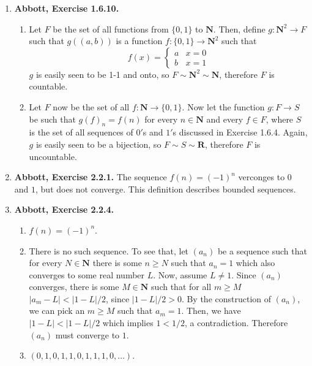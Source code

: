\documentclass{article}
\newcommand{\N}{\mathbf{N}}
\newcommand{\R}{\mathbf{R}}
\newcommand{\exc}[2][Abbott]{\item \textbf{#1, Exercise #2.}}
\begin{document}
\begin{enumerate}
	\exc{1.6.10}
				      	          
	\begin{enumerate}
		\item Let $F$ be the set of all functions from $\{0, 1\}$ to $\N$. Then, define $g : \N^2 \rightarrow F$ such that $g((a, b))$ is a function $f : \{0, 1\} \rightarrow \N^2$ such that \begin{equation*}
		      f(x) = \begin{cases}
		      a & x = 0 \\
		      b & x = 1
		\end{cases}
		\end{equation*}
		$g$ is easily seen to be 1-1 and onto, so $F \sim \N^2 \sim \N$, therefore $F$ is countable.
							      		      	        
		\item Let $F$ now be the set of all $f : \N \rightarrow \{0, 1\}$. Now let the function $g : F \rightarrow S$ be such that $g(f)_n = f(n)$ for every $n \in \N$ and every $f \in F$, where $S$ is the set of all sequences of $0'$s and $1'$s discussed in Exercise 1.6.4. Again, $g$ is easily seen to be a bijection, so $F \sim S \sim \R$, therefore $F$ is uncountable.
	\end{enumerate}
				      	          
	\exc{2.2.1}
	The sequence $f(n) = (-1)^n$ verconges to $0$ and $1$, but does not converge. This definition describes bounded sequences.
				      	          
	\exc{2.2.4}
				      	          
	\begin{enumerate}
		\item $f(n) = (-1)^n$.
		\item There is no such sequence. To see that, let $(a_n)$ be a sequence such that for every $N \in \N$ there is some $n \geq N$ such that $a_n = 1$ which also converges to some real number $L$. Now, assume $L \neq 1$. Since $(a_n)$ converges, there is some $M \in \N$ such that for all $m \geq M$ $|a_m - L| < |1-L|/2$, since $|1-L|/2 > 0$. By the construction of $(a_n)$, we can pick an $m \geq M$ such that $a_m = 1$. Then, we have $|1-L| < |1-L|/2$ which implies $1 < 1/2$, a contradiction. Therefore $(a_n)$ must converge to $1$.
		      		      		      	      	      	      	              
		\item $(0, 1, 0, 1, 1, 0, 1, 1, 1, 0, \dots)$.
	\end{enumerate}
				      	          

\end{enumerate}
\end{document}
